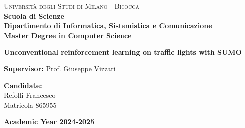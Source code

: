\documentclass[a4paper,12pt,twoside]{book}
\begin{document}
    
    \begin{titlepage}
        
        \noindent
        \begin{minipage}[t]{0.19\textwidth}
        \end{minipage}
        \begin{minipage}[t]{0.81\textwidth}
        {
                {\textsc{Università degli Studi di Milano - Bicocca}} \\
                \textbf{Scuola di Scienze} \\
                \textbf{Dipartimento di Informatica, Sistemistica e Comunicazione} \\
                \textbf{Master Degree in Computer Science} \\
                \par
        }
        \end{minipage}
        
	\vspace{40mm}
        
	\begin{center}
            {\LARGE{
                    \textbf{Unconventional reinforcement learning on traffic lights with SUMO}
                    \par
            }}
        \end{center}
        
        \vspace{50mm}

        \noindent
        {\large \textbf{Supervisor:} Prof. Giuseppe Vizzari}
        
        \vspace{15mm}

        \begin{flushright}
            {\large \textbf{Candidate:}} \\
            \large{Refolli Francesco} \\
            \large{Matricola 865955} 
        \end{flushright}
        
        \vspace{35mm}
        \begin{center}
            {\large{\bf Academic Year 2024-2025}}
        \end{center}

        \restoregeometry
        
    \end{titlepage}
\end{document}
